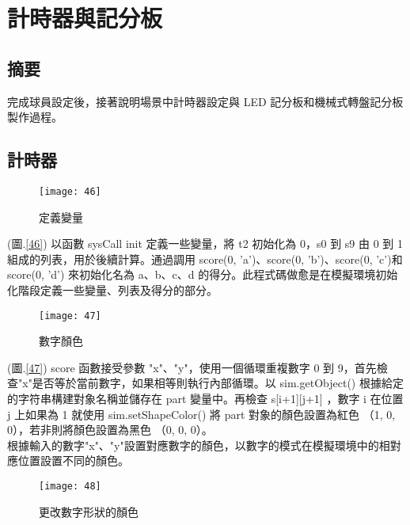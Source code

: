 \chapter{計時器與記分板}
\renewcommand{\baselinestretch}{10.0} %
\setcounter{page}{8}  %
\fontsize{14pt}{2.5pt}\sectionef
\section{摘要}
  完成球員設定後，接著說明場景中計時器設定與 LED 記分板和機械式轉盤記分板製作過程。\\
\section{計時器}
\begin{figure}[hbt!]
\begin{center}
\texttt{[image: 46]}
\caption{\Large 定義變量}\label{fig.46}
\end{center}
\end{figure}
(圖.\ref{46}) 以函數 sysCall init 定義一些變量，將 t2 初始化為 0，s0 到 s9 由 0 到 1 組成的列表，用於後續計算。通過調用 score(0, 'a')、score(0, 'b')、score(0, 'c')和 score(0, 'd') 來初始化名為 a、b、c、d 的得分。此程式碼做愈是在模擬環境初始化階段定義一些變量、列表及得分的部分。\\
\begin{figure}[hbt!]
\begin{center}
\texttt{[image: 47]}
\caption{\Large 數字顏色}\label{fig.47}
\end{center}
\end{figure}
(圖.\ref{47}) score 函數接受參數 "x"、"y"，使用一個循環重複數字 0 到 9，首先檢查"x"是否等於當前數字，如果相等則執行內部循環。以 sim.getObject() 根據給定的字符串構建對象名稱並儲存在 part 變量中。再檢查 s[i+1][j+1] ，數字 i 在位置 j 上如果為 1 就使用 sim.setShapeColor() 將 part 對象的顏色設置為紅色 （{1, 0, 0}），若非則將顏色設置為黑色 （{0, 0, 0}）。\\
  根據輸入的數字"x"、"y"設置對應數字的顏色，以數字的模式在模擬環境中的相對應位置設置不同的顏色。\\
\begin{figure}[hbt!]
\begin{center}
\texttt{[image: 48]}
\caption{\Large 更改數字形狀的顏色}\label{fig.48}
\end{center}
\end{figure}

